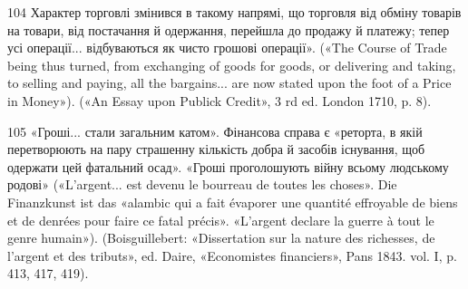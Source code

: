 104    Характер торговлі змінився в такому напрямі, що торговля від
обміну товарів на товари, від постачання й одержання, перейшла до продажу
й платежу; тепер усі операції... відбуваються як чисто грошові
операції». («The Course of Trade being thus turned, from exchanging of
goods for goods, or delivering and taking, to selling and paying, all the
bargains... are now stated upon the foot of a Price in Money»). («An Essay
upon Publick Credit», 3 rd ed. London 1710, p. 8).

105 «Гроші... стали загальним катом». Фінансова справа є «реторта, в
якій перетворюють на пару страшенну кількість добра й засобів існування,
щоб одержати цей фатальний осад». «Гроші проголошують війну всьому
людському родові» («L’argent... est devenu le bourreau de toutes les choses».
Die Finanzkunst ist das «alambic qui a fait évaporer une quantité
effroyable de biens et de denrées pour faire ce fatal précis». «L’argent declare
la guerre à tout le genre humain»). (Boisguillebert: «Dissertation sur la
nature des richesses, de l’argent et des tributs», ed. Daire, «Economistes
financiers», Pans 1843. vol. I, p. 413, 417, 419).
